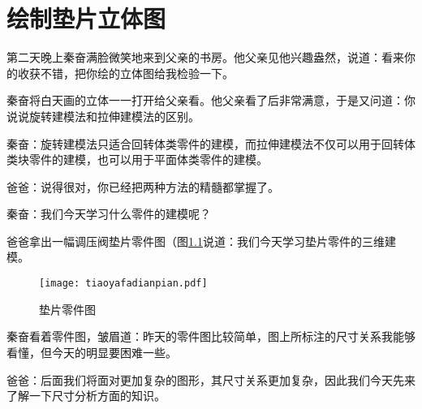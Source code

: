 \chapter{绘制垫片立体图}\label{chap:dianpian}
第二天晚上秦奋满脸微笑地来到父亲的书房。他父亲见他兴趣盎然，说道：看来你的收获不错，把你绘的立体图给我检验一下。

秦奋将白天画的立体一一打开给父亲看。他父亲看了后非常满意，于是又问道：你说说旋转建模法和拉伸建模法的区别。

秦奋：旋转建模法只适合回转体类零件的建模，而拉伸建模法不仅可以用于回转体类块零件的建模，也可以用于平面体类零件的建模。

爸爸：说得很对，你已经把两种方法的精髓都掌握了。

秦奋：我们今天学习什么零件的建模呢？

爸爸拿出一幅调压阀垫片零件图（图\ref{fig:tiaoyafadianpian}说道：我们今天学习垫片零件的三维建模。

\noindent
\begin{figure}[htbp]
\centering
\texttt{[image: tiaoyafadianpian.pdf]}
\caption{垫片零件图}\label{fig:tiaoyafadianpian}
\end{figure}

秦奋看着零件图，皱眉道：昨天的零件图比较简单，图上所标注的尺寸关系我能够看懂，但今天的明显要困难一些。

爸爸：后面我们将面对更加复杂的图形，其尺寸关系更加复杂，因此我们今天先来了解一下尺寸分析方面的知识。
\endinput